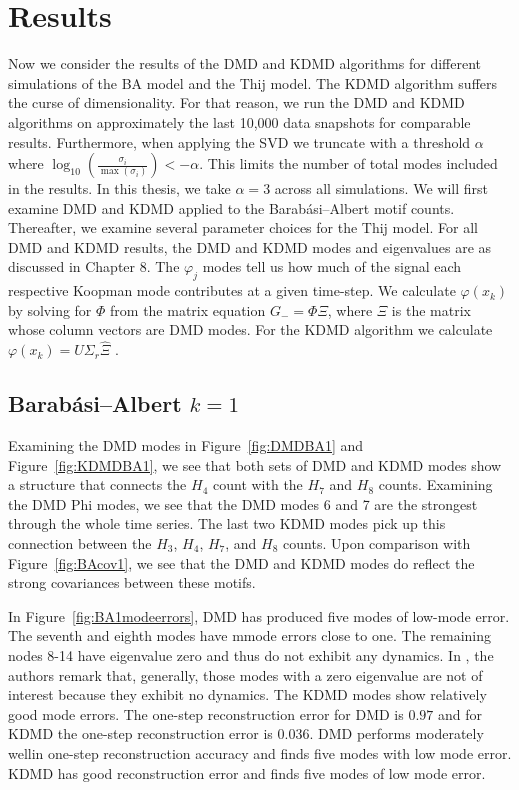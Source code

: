 \chapter{Results}
Now we consider the results of the DMD and KDMD algorithms for different simulations of the BA model and the Thij model. 
The KDMD algorithm suffers the curse of dimensionality. For that reason, we 
 run the DMD and KDMD algorithms on approximately the last 10,000 data snapshots for comparable 
 results. Furthermore, when applying the SVD we truncate with a threshold $\alpha$ where $\log_{10}\left(\frac{\sigma_i}{\max(\sigma_i)}\right)< -\alpha$. This limits
 the number of total modes included in the results. In this thesis, we take $\alpha=3$ across all simulations.
  We will first examine DMD and KDMD applied to the 
 Barabási–Albert motif counts. Thereafter, we examine several parameter choices for the Thij model.
 For all DMD and KDMD results, the DMD and KDMD modes
  and eigenvalues are as discussed in Chapter 8. The $\varphi_j$ modes tell us how much of the signal each respective Koopman mode contributes
   at a given time-step. We calculate $\varphi(x_k)$ by solving for $\Phi$ from the matrix equation $G_{-} = \Phi \Xi$, where $\Xi$ is the matrix
   whose column vectors are DMD modes. For the KDMD algorithm we calculate $\varphi(x_k) = U \Sigma_r {\hat \Xi}$ \cite{williams2015kernelbased}.

\section{Barabási–Albert \texorpdfstring{$k=1$}{k=1}}

Examining the DMD modes in Figure~\ref{fig:DMDBA1} and Figure~\ref{fig:KDMDBA1}, we see that both sets of DMD and KDMD modes
show a structure that connects the $H_{4}$ count with the $H_{7}$ and $H_{8}$ counts. Examining the DMD Phi modes, we see that 
the DMD modes 6 and 7 are the strongest through the whole time series. The last two KDMD modes pick up this connection between the 
$H_{3}$, $H_{4}$, $H_{7}$, and $H_{8}$ counts. Upon comparison with Figure~\ref{fig:BAcov1}, we see that the DMD and KDMD modes do
reflect the strong covariances between these motifs. 

In Figure~\ref{fig:BA1modeerrors}, DMD has produced five modes of low-mode error. The seventh and eighth 
modes have mmode errors close to one. The remaining nodes 8-14 have eigenvalue zero and thus do not exhibit any dynamics. In \cite{zhang2017evaluating}, the authors remark
that, generally, those modes with a zero eigenvalue are not of interest because they exhibit no dynamics. The KDMD modes
show relatively good mode errors. The one-step reconstruction error for DMD is $0.97$ and for KDMD the one-step reconstruction error is $0.036$.
 DMD performs moderately wellin one-step reconstruction accuracy and finds five modes with low mode error.
  KDMD has good reconstruction error and finds five modes of low mode error. 

